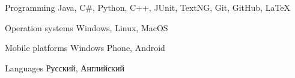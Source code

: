


\begin{cvskills}


\cvskill
{Programming} %
{Java, C\#, Python, C++, JUnit, TextNG, Git, GitHub, LaTeX} %



\cvskill
{Operation systems} %
{Windows, Linux, MacOS} %

\cvskill
{Mobile platforms} %
{Windows Phone, Android} %


\cvskill
{Languages} %
{Русский, Английский} %


\end{cvskills}